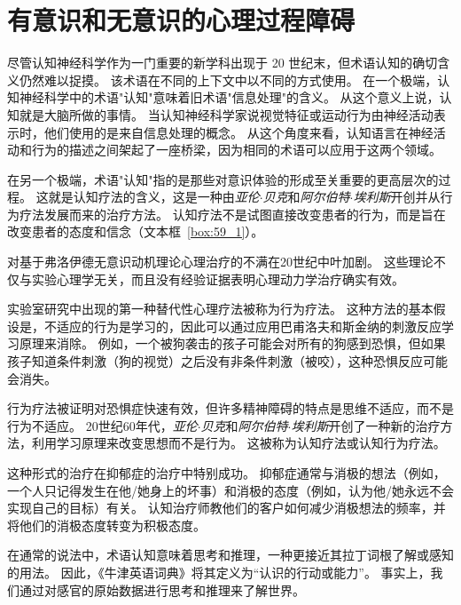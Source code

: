 \chapter{有意识和无意识的心理过程障碍} \label{chap:chap59}

尽管认知神经科学作为一门重要的新学科出现于 20 世纪末，但术语认知的确切含义仍然难以捉摸。
该术语在不同的上下文中以不同的方式使用。
在一个极端，认知神经科学中的术语"认知"意味着旧术语"信息处理"的含义。
从这个意义上说，认知就是大脑所做的事情。
当认知神经科学家说视觉特征或运动行为由神经活动表示时，他们使用的是来自信息处理的概念。
从这个角度来看，认知语言在神经活动和行为的描述之间架起了一座桥梁，因为相同的术语可以应用于这两个领域。


在另一个极端，术语"认知"指的是那些对意识体验的形成至关重要的更高层次的过程。
这就是认知疗法的含义，这是一种由\textit{亚伦$\cdot$贝克}和\textit{阿尔伯特$\cdot$埃利斯}开创并从行为疗法发展而来的治疗方法。
认知疗法不是试图直接改变患者的行为，而是旨在改变患者的态度和信念（文本框~\ref{box:59_1}）。



\begin{proposition}[认知疗法] \label{box:59_1}
	
	\quad \quad 对基于弗洛伊德无意识动机理论心理治疗的不满在20世纪中叶加剧。
	这些理论不仅与实验心理学无关，而且没有经验证据表明心理动力学治疗确实有效。
	
	\quad \quad 实验室研究中出现的第一种替代性心理疗法被称为行为疗法。
	这种方法的基本假设是，不适应的行为是学习的，因此可以通过应用巴甫洛夫和斯金纳的刺激反应学习原理来消除。
	例如，一个被狗袭击的孩子可能会对所有的狗感到恐惧，但如果孩子知道条件刺激（狗的视觉）之后没有非条件刺激（被咬），这种恐惧反应可能会消失。
	
	\quad \quad 行为疗法被证明对恐惧症快速有效，但许多精神障碍的特点是思维不适应，而不是行为不适应。
	20世纪60年代，\textit{亚伦$\cdot$贝克}和\textit{阿尔伯特$\cdot$埃利斯}开创了一种新的治疗方法，利用学习原理来改变思想而不是行为。
	这被称为认知疗法或认知行为疗法。
	
	\quad \quad 这种形式的治疗在抑郁症的治疗中特别成功。
	抑郁症通常与消极的想法（例如，一个人只记得发生在他/她身上的坏事）和消极的态度（例如，认为他/她永远不会实现自己的目标）有关。
	认知治疗师教他们的客户如何减少消极想法的频率，并将他们的消极态度转变为积极态度。
	
\end{proposition}



在通常的说法中，术语认知意味着思考和推理，一种更接近其拉丁词根了解或感知的用法。
因此，《牛津英语词典》将其定义为“认识的行动或能力”。
事实上，我们通过对感官的原始数据进行思考和推理来了解世界。


